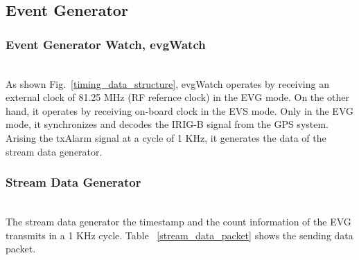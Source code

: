 \documentclass[journal,reqno]{IEEEtran}
\begin{document}

\subsection{Event Generator}
\subsubsection{Event Generator Watch, evgWatch}\hspace*{\fill} \\
As shown Fig.~\ref{timing_data_structure}, evgWatch operates by receiving an external clock of 81.25 MHz (RF refernce clock) in the EVG mode. On the other hand, it operates by receiving on-board clock in the EVS mode. Only in the EVG mode, it synchronizes and decodes the IRIG-B signal from the GPS system. Arising the txAlarm signal at a cycle of 1 KHz, it generates the data of the stream data generator.\newline

\subsubsection{Stream Data Generator}\hspace*{\fill} \\
The stream data generator the timestamp and the count information of the EVG transmits in a 1 KHz cycle.
Table ~\ref{stream_data_packet} shows the sending data packet.\newline
\end{document}
